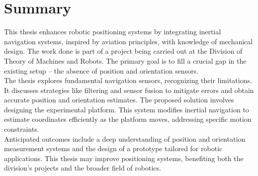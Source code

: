 \section{Summary}

This thesis enhances robotic positioning systems by integrating inertial navigation systems, inspired by aviation principles, with knowledge of mechanical design. The work done is part of a project being carried out at the Division of Theory of Machines and Robots. The primary goal is to fill a crucial gap in the existing setup – the absence of position and orientation sensors.\\

The thesis explores fundamental navigation sensors, recognizing their limitations. It discusses strategies like filtering and sensor fusion to mitigate errors and obtain accurate position and orientation estimates. The proposed solution involves designing the experimental platform. This system modifies inertial navigation to estimate coordinates efficiently as the platform moves, addressing specific motion constraints.\\

Anticipated outcomes include a deep understanding of position and orientation measurement systems and the design of a prototype tailored for robotic applications. This thesis may improve positioning systems, benefiting both the division's projects and the broader field of robotics.